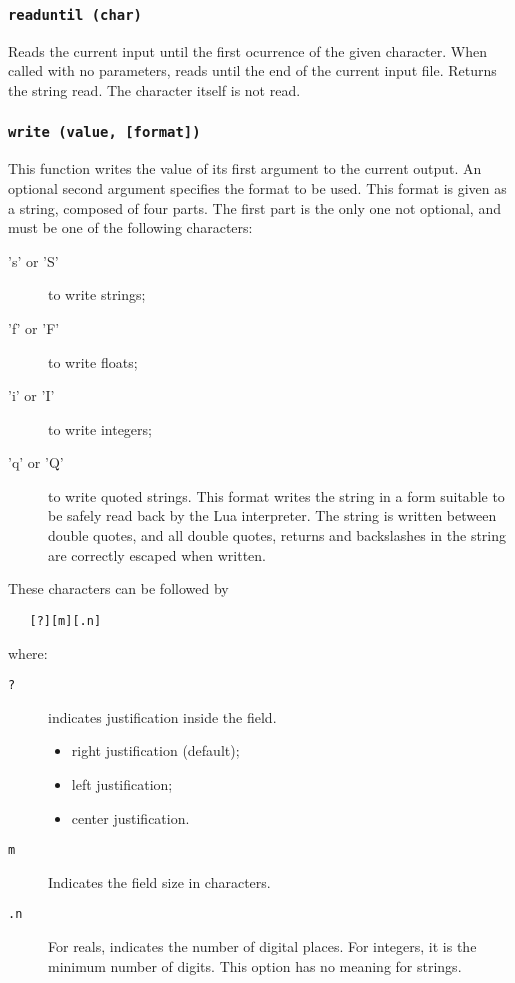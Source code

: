 \subsubsection*{{\tt readuntil (char)}}

Reads the current input until the first ocurrence of the given character.
When called with no parameters,
reads until the end of the current input file.
Returns the string read.
The character itself is not read.

\subsubsection*{{\tt write (value, [format])}}

This function writes the value of its first argument to the current output.
An optional second argument specifies the format to be used.
This format is given as a string, composed of four parts.
The first part is the only one not optional, and must be one of the
following characters:
\begin{description}
\item['s' or 'S'] to write strings;
\item['f' or 'F'] to write floats;
\item['i' or 'I'] to write integers;
\item['q' or 'Q'] to write quoted strings.
This format writes the string in a form suitable to be safely read
back by the Lua interpreter.
The string is written between double quotes,
and all double quotes, returns and backslashes in the string
are correctly escaped when written.
\end{description}
These characters can be followed by
\begin{verbatim}
   [?][m][.n]
\end{verbatim}
where:
\begin{description}
\item[\verb'?'] indicates justification inside the field.
\begin{itemize}
\item['\verb'<''] right justification (default);
\item['\verb'>''] left justification;
\item['\verb'|''] center justification.
\end{itemize}
\item[\verb'm'] Indicates the field size in characters.
\item[\verb'.n'] For reals, indicates the number of digital places.
For integers, it is the minimum number of digits.
This option has no meaning for strings.
\end{description}

